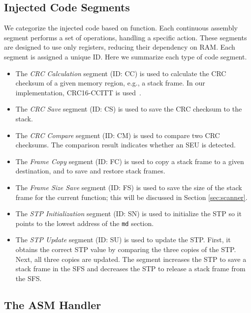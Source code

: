 \subsection{Injected Code Segments}

We categorize the injected code based on function. Each continuous assembly segment performs a set of operations, handling a specific action. These segments are designed to use only registers, reducing their dependency on RAM. Each segment is assigned a unique ID. Here we summarize each type of code segment.

\begin{itemize} \itemsep 0in

\item The \textit{CRC Calculation} segment (ID: CC) is used to calculate the CRC checksum of a given memory region, e.g., a stack frame. In our implementation, CRC16-CCITT is used~\cite{crc16}.

\item The \textit{CRC Save} segment (ID: CS) is used to save the CRC checksum to the stack.

\item The \textit{CRC Compare} segment (ID: CM) is used to compare two CRC checksums. The comparison result indicates whether an SEU is detected.

\item The \textit{Frame Copy} segment (ID: FC) is used to copy a stack frame to a given destination, and to save and restore stack frames.

\item The \textit{Frame Size Save} segment (ID: FS) is used to save the size of the stack frame for the current function; this will be discussed in Section \ref{sec:scanner}.

\item The \textit{STP Initialization} segment (ID: SN) is used to initialize the STP so it points to the lowest address of the \texttt{md} section.

\item The \textit{STP Update} segment (ID: SU) is used to update the STP. First, it obtains the correct STP value by comparing the three copies of the STP. Next, all three copies are updated. The segment increases the STP to save a stack frame in the SFS and decreases the STP to release a stack frame from the SFS.

\end{itemize}

\subsection{The ASM Handler}


